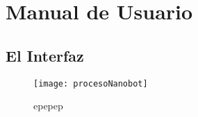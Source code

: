 \chapter{Manual de Usuario}
\label{chap:manual_de_usuario}

\section{El Interfaz}
\label{sec:interfaz}

\begin{figure}
 \texttt{[image: procesoNanobot]}
 \centering
 \caption{epepep}
\end{figure}
